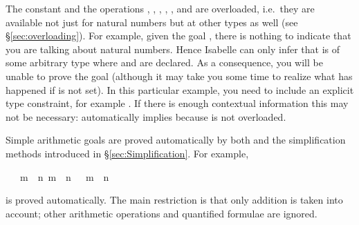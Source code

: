 \begin{isabellebody}
\begin{isamarkuptext}
\begin{warn}
  The constant  and the operations
  , ,
  , ,
  ,  and
   are overloaded, i.e.\ they are available
  not just for natural numbers but at other types as well (see
  \S\ref{sec:overloading}). For example, given the goal ,
  there is nothing to indicate that you are talking about natural numbers.
  Hence Isabelle can only infer that  is of some arbitrary type where
   and \isa{{\isacharplus}} are declared. As a consequence, you will be unable
  to prove the goal (although it may take you some time to realize what has
  happened if  is not set).  In this particular example,
  you need to include an explicit type constraint, for example
  . If there is enough contextual information this
  may not be necessary:  automatically implies
   because  is not overloaded.
\end{warn}

Simple arithmetic goals are proved automatically by both  and the
simplification methods introduced in \S\ref{sec:Simplification}.  For
example,%
\end{isamarkuptext}%
\ {\isachardoublequote}{\isasymlbrakk}\ {\isasymnot}\ m\ {\isacharless}\ n{\isacharsemicolon}\ m\ {\isacharless}\ n{\isacharplus}{}\ {\isasymrbrakk}\ {\isasymLongrightarrow}\ m\ {\isacharequal}\ n{\isachardoublequote}%
\begin{isamarkuptext}%
\noindent
is proved automatically. The main restriction is that only addition is taken
into account; other arithmetic operations and quantified formulae are ignored.


\end{isamarkuptext}
\end{isabellebody}
